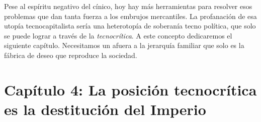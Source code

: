 \documentclass[
]{article}
\begin{document}
Pese al espíritu negativo del cínico, hoy hay más herramientas para
resolver esos problemas que dan tanta fuerza a los embrujos mercantiles.
La profanación de esa utopía tecnocapitalista sería una heterotopía de
soberanía tecno política, que solo se puede lograr a través de la
\emph{tecnocrítica}. A este concepto dedicaremos el siguiente capítulo.
Necesitamos un afuera a la jerarquía familiar que solo es la fábrica de
deseo que reproduce la sociedad.

\hypertarget{capuxedtulo-4-la-posiciuxf3n-tecnocruxedtica-es-la-destituciuxf3n-del-imperio}{%
\section{Capítulo 4: La posición tecnocrítica es la destitución del
Imperio}\label{capuxedtulo-4-la-posiciuxf3n-tecnocruxedtica-es-la-destituciuxf3n-del-imperio}}
\end{document}
